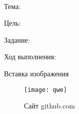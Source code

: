 \begin{center}
\WorkType
\\
Тема: \Topic 

Цель: 
\end{center}
Задание:


Ход выполнения:

Вставка изображения 
\begin{figure}[h]
\centering
\texttt{[image: qwe]}
\caption{Сайт github.com}
\label{fig:qwe}
\end{figure}



\newpage



